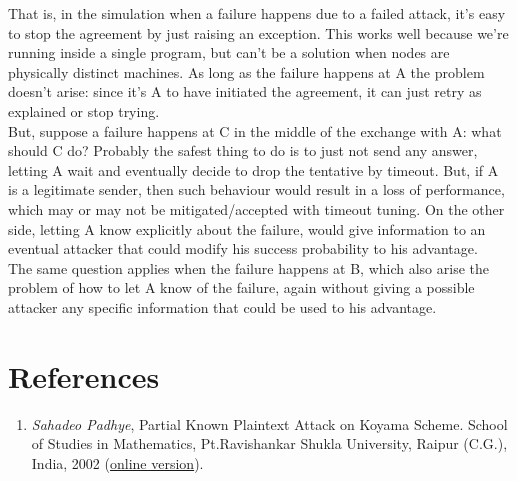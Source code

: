 \documentclass[a4paper,12pt,titlepage]{article}
\begin{document}
That is, in the simulation when a failure happens due to a failed attack, it's
easy to stop the agreement by just raising an exception. This works well
because we're running inside a single program, but can't be a solution when
nodes are physically distinct machines. As long as the failure happens at A
the problem doesn't arise: since it's A to have
initiated the agreement, it can just retry as explained or stop trying. \\
But, suppose a failure happens at C in the middle of the exchange with A: what
should C do? Probably the safest thing to do is to just not send any answer,
letting A wait and eventually decide to drop the tentative by timeout. But, if
A is a legitimate sender, then such behaviour would result in a loss of
performance, which may or may not be mitigated/accepted with timeout tuning. On
the other side, letting A know explicitly about the failure, would give
information to an eventual attacker that could modify his success probability
to his advantage. \\
The same question applies when the failure happens at B, which also arise the
problem of how to let A know of the failure, again without giving a possible
attacker any specific information that could be used to his advantage.

\section{References}
\begin{enumerate}
  \item \emph{Sahadeo Padhye}, Partial Known Plaintext Attack on Koyama Scheme.
  School of Studies in Mathematics, Pt.Ravishankar Shukla University, Raipur
  (C.G.), India, 2002
  (\href{http://www.academia.edu/1438617/Partial_Known_Plaintext_Attack_on_Koyama_Scheme}{online
  version}).
\end{enumerate}
\end{document}

